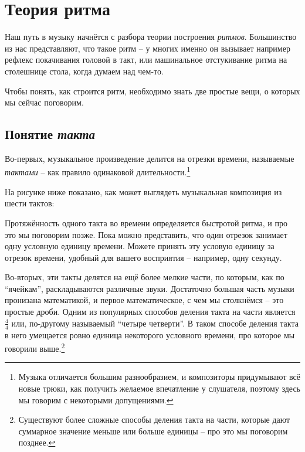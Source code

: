 \documentclass[../sparc.tex]{subfiles}
\begin{document}
\newpage
\section{Теория ритма}

Наш путь в музыку начнётся с разбора теории построения \emph{ритмов}.
Большинство из нас представляют, что такое ритм -- у многих именно он вызывает
например рефлекс покачивания головой в такт, или машинальное отстукивание ритма
на столешнице стола, когда думаем над чем-то.

Чтобы понять, как строится ритм, необходимо знать две простые вещи, о которых мы
сейчас поговорим.

\subsection{Понятие \emph{такта}}

Во-первых, музыкальное произведение делится на отрезки времени, называемые
\emph{тактами} -- как правило одинаковой длительности.\footnote{Музыка отличается
большим разнообразием, и композиторы придумывают всё новые трюки, как получить
желаемое впечатление у слушателя, поэтому здесь мы говорим с некоторыми
допущениями.}

На рисунке ниже показано, как может выглядеть музыкальная композиция из шести
тактов:


Протяжённость одного такта во времени определяется быстротой ритма, и про это мы
поговорим позже. Пока можно представить, что один отрезок занимает одну условную
единицу времени. Можете принять эту условую единицу за отрезок времени, удобный
для вашего восприятия -- например, одну секунду.

Во-вторых, эти такты делятся на ещё более мелкие части, по которым, как по
``ячейкам'', раскладываются различные звуки. Достаточно большая часть музыки
пронизана математикой, и первое математическое, с чем мы столкнёмся -- это
простые дроби. Одним из популярных способов деления такта на части является
$\frac{4}{4}$ или, по-другому называемый ``четыре четверти''. В таком способе
деления такта в него умещается ровно единица некоторого условного времени, про
которое мы говорили выше.\footnote{Существуют более сложные способы деления
такта на части, которые дают суммарное значение меньше или больше единицы -- про
это мы поговорим позднее.}
\end{document}
